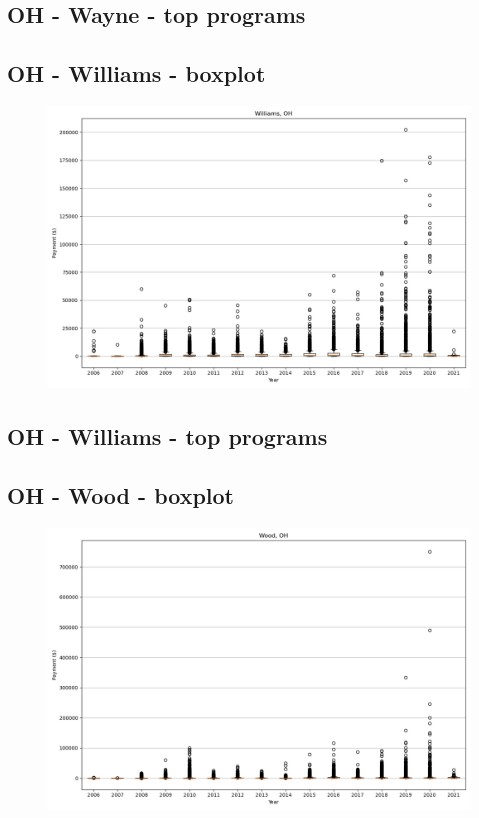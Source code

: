 \subsection*{OH - Wayne - top programs}

\newpage
\subsection*{OH - Williams - boxplot}
\begin{figure}[h]
\centering
\includegraphics[width=7in]{../output/boxplots/counties/Williams-OH_boxplot.png}
\end{figure}


\subsection*{OH - Williams - top programs}

\newpage
\subsection*{OH - Wood - boxplot}
\begin{figure}[h]
\centering
\includegraphics[width=7in]{../output/boxplots/counties/Wood-OH_boxplot.png}
\end{figure}



